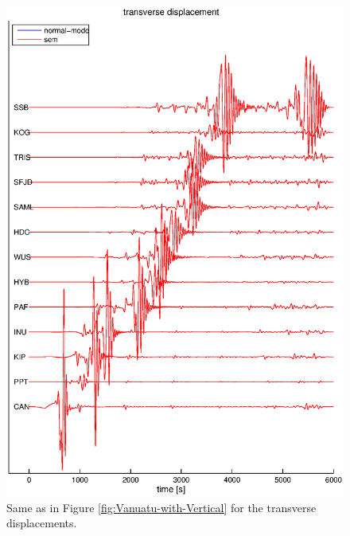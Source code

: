 \documentclass[oneside,english]{book}
\begin{document}
\begin{figure}[ht]
\noindent \begin{centering}
\includegraphics[scale=0.75]{figures/vanuatu_trans.eps}\caption{\label{fig:Vanuatu-with-Transverse}Same as in Figure \ref{fig:Vanuatu-with-Vertical}
for the transverse displacements.}

\par\end{centering}
\end{figure}
%
\end{document}
